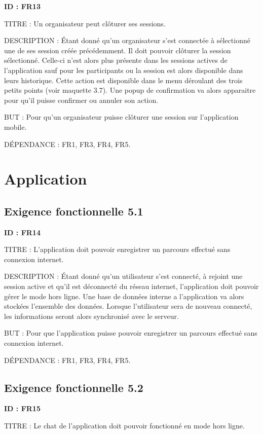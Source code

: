 \documentclass[titlepage, 12pt]{report}
\begin{document}
\textbf{ID : FR13}

TITRE : Un organisateur peut clôturer ses sessions.

DESCRIPTION : Étant donné qu'un organisateur s'est connectée à sélectionné une de ses session créée précédemment. Il doit pouvoir clôturer la session sélectionné. Celle-ci n'est alors plus présente dans les sessions actives de l'application sauf pour les participants ou la session est alors disponible dans leurs historique. Cette action est disponible dans le menu déroulant des trois petits points (voir maquette 3.7). Une popup de confirmation va alors apparaitre pour qu'il puisse confirmer ou annuler son action.

BUT : Pour qu'un organisateur puisse clôturer une session sur l'application mobile.

DÉPENDANCE : FR1, FR3, FR4, FR5.

\section{Application}

\subsection{Exigence fonctionnelle 5.1}

\textbf{ID : FR14}

TITRE : L'application doit pouvoir enregistrer un parcours effectué sans connexion internet.

DESCRIPTION : Étant donné qu'un utilisateur s'est connecté, à rejoint une session active et qu'il est déconnecté du réseau internet, l'application doit pouvoir gérer le mode hors ligne. Une base de données interne a l'application va alors stockées l'ensemble des données. Lorsque l'utilisateur sera de nouveau connecté, les informations seront alors synchronisé avec le serveur.

BUT : Pour que l'application puisse pouvoir enregistrer un parcours effectué sans connexion internet. 

DÉPENDANCE : FR1, FR3, FR4, FR5.

\subsection{Exigence fonctionnelle 5.2}

\textbf{ID : FR15}

TITRE : Le chat de l'application doit pouvoir fonctionné en mode hors ligne.
\end{document}
